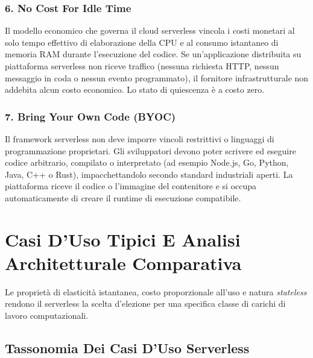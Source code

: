 \documentclass[11pt, a4paper]{article}
\begin{document}
\subsubsection{6. No Cost For Idle Time}
Il modello economico che governa il cloud serverless vincola i costi monetari al solo tempo effettivo di elaborazione della CPU e al consumo istantaneo di memoria RAM durante l'esecuzione del codice. Se un'applicazione distribuita su piattaforma serverless non riceve traffico (nessuna richiesta HTTP, nessun messaggio in coda o nessun evento programmato), il fornitore infrastrutturale non addebita alcun costo economico. Lo stato di quiescenza è a costo zero.

\subsubsection{7. Bring Your Own Code (BYOC)}
Il framework serverless non deve imporre vincoli restrittivi o linguaggi di programmazione proprietari. Gli sviluppatori devono poter scrivere ed eseguire codice arbitrario, compilato o interpretato (ad esempio Node.js, Go, Python, Java, C++ o Rust), impacchettandolo secondo standard industriali aperti. La piattaforma riceve il codice o l'immagine del contenitore e si occupa automaticamente di creare il runtime di esecuzione compatibile.

\newpage


\section{Casi D'Uso Tipici E Analisi Architetturale Comparativa}

Le proprietà di elasticità istantanea, costo proporzionale all'uso e natura \emph{stateless} rendono il serverless la scelta d'elezione per una specifica classe di carichi di lavoro computazionali.

\subsection{Tassonomia Dei Casi D'Uso Serverless}
\end{document}
